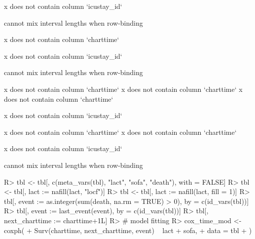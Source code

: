 \documentclass[
]{jss}
\begin{document}
\begin{CodeChunk}
\begin{CodeOutput}
x does not contain column `icustay_id`
\end{CodeOutput}

\begin{CodeOutput}
cannot mix interval lengths when row-binding
\end{CodeOutput}

\begin{CodeOutput}
x does not contain column `charttime`
\end{CodeOutput}

\begin{CodeOutput}
x does not contain column `icustay_id`
\end{CodeOutput}

\begin{CodeOutput}
cannot mix interval lengths when row-binding
\end{CodeOutput}

\begin{CodeOutput}
x does not contain column `charttime`
x does not contain column `charttime`
x does not contain column `charttime`
\end{CodeOutput}

\begin{CodeOutput}
x does not contain column `icustay_id`
\end{CodeOutput}

\begin{CodeOutput}
x does not contain column `charttime`
x does not contain column `charttime`
\end{CodeOutput}

\begin{CodeOutput}
x does not contain column `icustay_id`
\end{CodeOutput}

\begin{CodeOutput}
cannot mix interval lengths when row-binding
\end{CodeOutput}

\begin{CodeInput}
R> tbl <- tbl[, c(meta_vars(tbl), "lact", "sofa", "death"), with = FALSE]
R> tbl <- tbl[, lact := nafill(lact, "locf")]
R> tbl <- tbl[, lact := nafill(lact, fill = 1)]
R> tbl[, event := as.integer(sum(death, na.rm = TRUE) > 0), by = c(id_vars(tbl))]
R> tbl[, event := last_event(event), by = c(id_vars(tbl))]
R> tbl[, next_charttime := charttime+1L]
R> # model fitting
R> cox_time_mod <- coxph(
+   Surv(charttime, next_charttime, event) ~ lact + sofa,
+   data = tbl
+ )
\end{CodeInput}
\end{CodeChunk}
\end{document}

